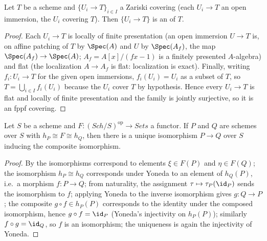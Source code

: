 \begin{lemma}
\label{lem:pc-zariski-coverings-are-fppf}
Let $T$ be a scheme and $\{U_i\to T\}_{i\in I}$ a Zariski covering
(each $U_i\to T$ an open immersion, the $U_i$ covering $T$).  Then
$\{U_i\to T\}$ is an
 of $T$.
\end{lemma}
\begin{proof}
Each $U_i\to T$ is locally of finite presentation (an open immersion
$U\to T$ is, on affine patching of $T$ by $\Spec(A)$ and $U$ by
$\Spec(A_f)$, the map $\Spec(A_f)\to\Spec(A)$; $A_f=A[x]/(fx-1)$ is a
finitely presented $A$-algebra) and flat (the localization $A\to A_f$
is flat: localization is exact).  Finally, writing $f_i\colon U_i\to T$
for the given open immersions, $f_i(U_i)=U_i$ as a subset of $T$, so
$T=\bigcup_{i\in I}f_i(U_i)$ because the $U_i$ cover $T$ by hypothesis.
Hence every $U_i\to T$ is flat and locally of finite presentation and the
family is jointly surjective, so it is an fppf covering.
\end{proof}

\begin{lemma}
\label{lem:pc-representable-unique}
Let $S$ be a scheme and
$F:(\mathit{Sch}/S)^{\mathrm{op}}\to\textit{Sets}$ a functor.  If $P$ and
$Q$ are schemes over $S$ with $h_P\cong F\cong h_Q$, then there is a
unique isomorphism $P\to Q$ over $S$ inducing the composite isomorphism.
\end{lemma}
\begin{proof}
By  the isomorphisms correspond to elements
$\xi\in F(P)$ and $\eta\in F(Q)$; the isomorphism
$h_P\cong h_Q$ corresponds under Yoneda to an element of $h_Q(P)$, i.e.\
a morphism $f:P\to Q$; from naturality, the assignment
$\tau\mapsto\tau_P(\id_P)$ sends the isomorphism to $f$; applying
Yoneda to the inverse isomorphism gives $g:Q\to P$; the composite
$g\circ f\in h_P(P)$ corresponds to the identity under the composed
isomorphism, hence $g\circ f=\id_P$ (Yoneda's injectivity on
$h_P(P)$); similarly $f\circ g=\id_Q$, so $f$ is an isomorphism; the
uniqueness is again the injectivity of Yoneda.
\end{proof}


